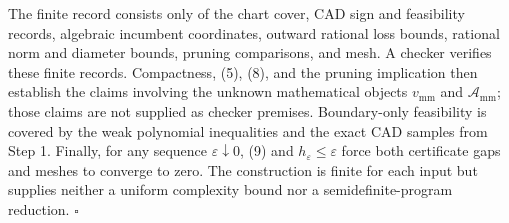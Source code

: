 The finite record consists only of the chart cover, CAD sign and feasibility records, algebraic incumbent coordinates, outward rational loss bounds, rational norm and diameter bounds, pruning comparisons, and mesh.  A checker verifies these finite records.  Compactness, (5), (8), and the pruning implication then establish the claims involving the unknown mathematical objects \(v_{\mathrm{mm}}\) and \(\mathcal A_{\mathrm{mm}}\); those claims are not supplied as checker premises.  Boundary-only feasibility is covered by the weak polynomial inequalities and the exact CAD samples from Step 1.  Finally, for any sequence \(\varepsilon\downarrow0\), (9) and \(h_\varepsilon\le\varepsilon\) force both certificate gaps and meshes to converge to zero.  The construction is finite for each input but supplies neither a uniform complexity bound nor a semidefinite-program reduction. \(\square\)